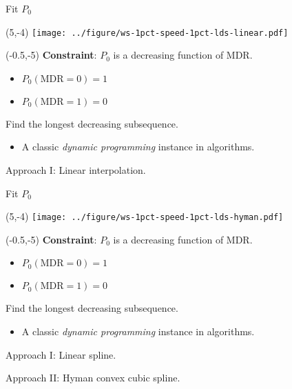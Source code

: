 \documentclass[aspectratio=169]{beamer}
\begin{document}
\begin{frame}{Fit $P_0$}
\begin{textblock}{1}(5,-4)
\texttt{[image: ../figure/ws-1pct-speed-1pct-lds-linear.pdf]}
\end{textblock}

\begin{textblock}{5}(-0.5,-5)
\textbf{Constraint}: $P_0$ is a decreasing function of MDR. 
\begin{itemize}
\item $P_0(\text{MDR}=0) = 1$

\item $P_0(\text{MDR}=1) = 0$
\end{itemize}\medskip

Find the longest decreasing subsequence.
\begin{itemize}
\item A classic \textit{dynamic programming} instance in algorithms.
\end{itemize}\medskip

Approach I: Linear interpolation.


\end{textblock}
\end{frame}


\begin{frame}{Fit $P_0$}
\begin{textblock}{1}(5,-4)
\texttt{[image: ../figure/ws-1pct-speed-1pct-lds-hyman.pdf]}
\end{textblock}

\begin{textblock}{5}(-0.5,-5)
\textbf{Constraint}: $P_0$ is a decreasing function of MDR. 
\begin{itemize}
\item $P_0(\text{MDR}=0) = 1$

\item $P_0(\text{MDR}=1) = 0$
\end{itemize}\medskip

Find the longest decreasing subsequence.
\begin{itemize}
\item A classic \textit{dynamic programming} instance in algorithms.
\end{itemize}\medskip

Approach I: Linear spline.\medskip

Approach II: Hyman convex cubic spline.
\end{textblock}
\end{frame}
\end{document}
